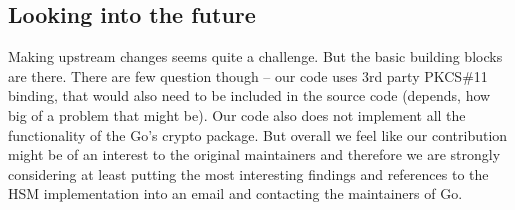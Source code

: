 \documentclass[a4paper]{scrartcl}
\begin{document}
\subsection{Looking into the future}
Making upstream changes seems quite a challenge. But the basic building blocks are there. There are few question though -- our code uses 3rd party PKCS\#11 binding, that would also need to be included in the source code (depends, how big of a problem that might be). Our code also does not implement all the functionality of the Go's crypto package. But overall we feel like our contribution might be of an interest to the original maintainers and therefore we are strongly considering at least putting the most interesting findings and references to the HSM implementation into an email and contacting the maintainers of Go.





\end{document}
